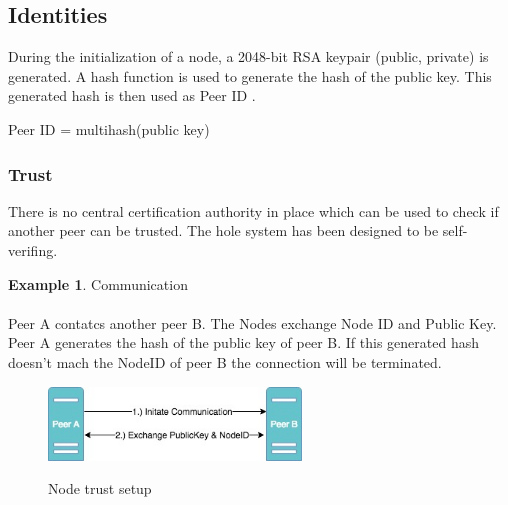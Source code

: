 \documentclass[a4paper,11pt, oneside]{report}
\theoremstyle{definition}
\newtheorem{exmp}{Example}[subsection]
\begin{document}
\newpage
\subsection{Identities}
During the initialization of a node, a 2048-bit RSA keypair (public, private) is generated. A hash function is used to generate the hash of the public key. This generated hash is then used as Peer ID \cite{PeerID}.
\begin{center}
Peer ID = multihash(public key)
\end{center}

\subsubsection{Trust}
There is no central certification authority in place which can be used to check if another peer can be trusted. The hole system has been designed to be self-verifing.\\[0.3cm]
\begin{exmp} Communication\\ \\
Peer A contatcs another peer B. The Nodes exchange Node ID and Public Key.
Peer A generates the hash of the public key of peer B. If this generated hash doesn't mach the NodeID of peer B the connection will be terminated.\\[0.3cm]
\begin{figure}[H]
\centering
\includegraphics[width=0.6\textwidth]{img/ipfs_peertrust_scenario_init.jpg}\\[0.8cm]
\caption[Node trust]{Node trust setup}
\end{figure}
\end{exmp}
\newpage
\end{document}
